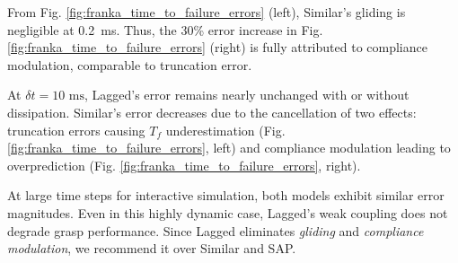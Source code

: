 From Fig. \ref{fig:franka_time_to_failure_errors} (left), Similar's gliding is
negligible at 0.2~ms. Thus, the 30\% error increase in Fig.
\ref{fig:franka_time_to_failure_errors} (right) is fully attributed to
compliance modulation, comparable to truncation error.

At $\delta t=10\text{ ms}$, Lagged's error remains nearly unchanged with or
without dissipation. Similar's error decreases due to the cancellation of two
effects: truncation errors causing $T_f$ underestimation (Fig.
\ref{fig:franka_time_to_failure_errors}, left) and compliance modulation leading
to overprediction (Fig. \ref{fig:franka_time_to_failure_errors}, right).

At large time steps for interactive simulation, both models exhibit similar
error magnitudes. Even in this highly dynamic case, Lagged's weak coupling
does not degrade grasp performance. Since Lagged eliminates \emph{gliding} and
\emph{compliance modulation}, we recommend it over Similar and SAP.
